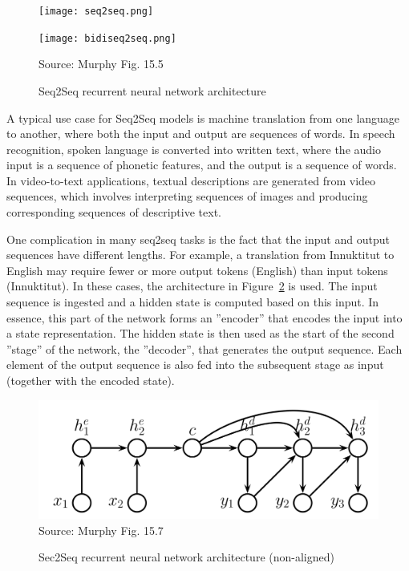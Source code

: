 \begin{figure}
\centering
\begin{minipage}{.45\textwidth}
\centering

\texttt{[image: seq2seq.png]} 
\end{minipage}
\begin{minipage}{.45\textwidth}
\centering

\texttt{[image: bidiseq2seq.png]}
\end{minipage}

\scriptsize Source: Murphy Fig. 15.5
\caption{Seq2Seq recurrent neural network architecture}
\label{fig:seq2seq}
\end{figure}

A typical use case for Seq2Seq models is machine translation from one language to another, where both the input and output are sequences of words. In speech recognition, spoken language is converted into written text, where the audio input is a sequence of phonetic features, and the output is a sequence of words. In video-to-text applications, textual descriptions are generated from video sequences, which involves interpreting sequences of images and producing corresponding sequences of descriptive text.

One complication in many seq2seq tasks is the fact that the input and output sequences have different lengths. For example, a translation from Innuktitut to English may require fewer or more output tokens (English) than input tokens (Innuktitut). In these cases, the architecture in Figure~\ref{fig:seq2seq_nonaligned} is used. The input sequence is ingested and a hidden state is computed based on this input. In essence, this part of the network forms an ''encoder'' that encodes the input into a state representation. The hidden state is then used as the start of the second ''stage'' of the network, the ''decoder'', that generates the output sequence. Each element of the output sequence is also fed into the subsequent stage as input (together with the encoded state).

\begin{figure}
\centering
\includegraphics[width=.75\textwidth]{seq2seq_nonaligned.png} \\

\scriptsize Source: Murphy Fig. 15.7
\caption{Sec2Seq recurrent neural network architecture (non-aligned)}
\label{fig:seq2seq_nonaligned}
\end{figure}


